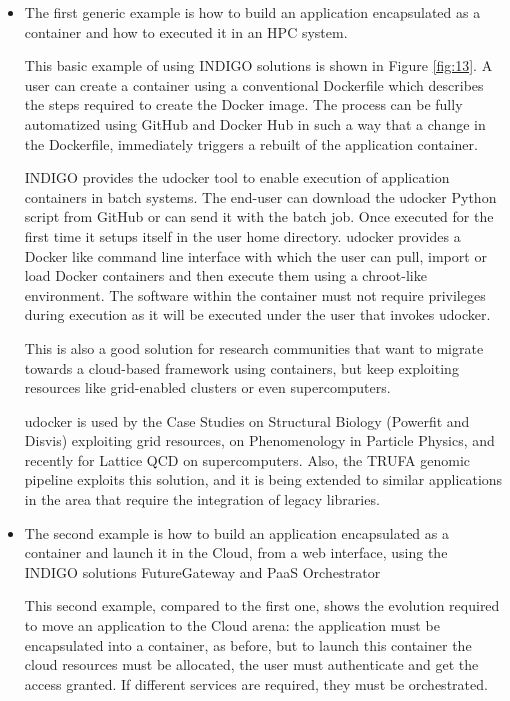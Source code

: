 \documentclass{article}
\begin{document}
\begin{itemize}

\item The first generic example is how to build an application encapsulated as a container and how to executed it in an HPC system.

This basic example of using INDIGO solutions is shown in Figure \ref{fig:13}. A user can create a container using a conventional Dockerfile which describes the steps required to create the Docker image. The process can be fully automatized using GitHub and Docker Hub in such a way that a change in the Dockerfile, immediately triggers a rebuilt of the application container.

INDIGO provides the udocker tool to enable execution of application containers in batch systems. The end-user can download the udocker Python script from GitHub or can send it with the batch job. Once executed for the first time it setups itself in the user home directory. udocker provides a Docker like command line interface with which the user can pull, import or load Docker containers and then execute them using a chroot-like environment. The software within the container must not require privileges during execution as it will be executed under the user that invokes udocker.


This is also a good solution for research communities that want to migrate towards a cloud-based framework using containers, but keep exploiting resources like grid-enabled clusters or even supercomputers. 

udocker is used by the Case Studies on Structural Biology (Powerfit and Disvis) exploiting grid resources, on Phenomenology in Particle Physics, and recently for Lattice QCD on supercomputers. Also, the TRUFA genomic pipeline exploits this solution, and it is being extended to similar applications in the area that require the integration of legacy libraries. 


\item The second example is how to build an application encapsulated as a container and launch it in the Cloud, from a web interface, using the INDIGO solutions FutureGateway and PaaS Orchestrator

This second example, compared to the first one, shows the evolution required to move an application to the Cloud arena: the application must be encapsulated into a container, as before, but to launch this container the cloud resources must be allocated, the user must authenticate and get the access granted. If different services are required, they must be orchestrated.



\end{itemize}
\end{document}
